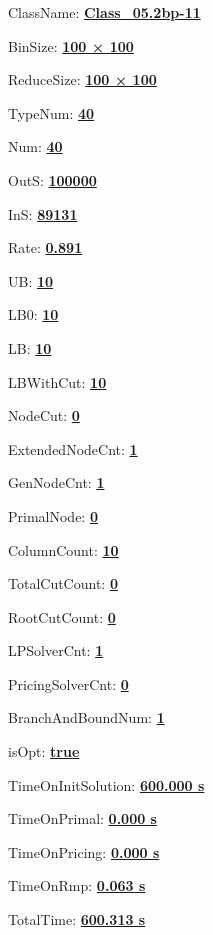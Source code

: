 \documentclass[11pt]{article}
\begin{document}
\pagestyle{empty}


ClassName: \underline{\textbf{Class_05.2bp-11}}
\par
BinSize: \underline{\textbf{100 × 100}}
\par
ReduceSize: \underline{\textbf{100 × 100}}
\par
TypeNum: \underline{\textbf{40}}
\par
Num: \underline{\textbf{40}}
\par
OutS: \underline{\textbf{100000}}
\par
InS: \underline{\textbf{89131}}
\par
Rate: \underline{\textbf{0.891}}
\par
UB: \underline{\textbf{10}}
\par
LB0: \underline{\textbf{10}}
\par
LB: \underline{\textbf{10}}
\par
LBWithCut: \underline{\textbf{10}}
\par
NodeCut: \underline{\textbf{0}}
\par
ExtendedNodeCnt: \underline{\textbf{1}}
\par
GenNodeCnt: \underline{\textbf{1}}
\par
PrimalNode: \underline{\textbf{0}}
\par
ColumnCount: \underline{\textbf{10}}
\par
TotalCutCount: \underline{\textbf{0}}
\par
RootCutCount: \underline{\textbf{0}}
\par
LPSolverCnt: \underline{\textbf{1}}
\par
PricingSolverCnt: \underline{\textbf{0}}
\par
BranchAndBoundNum: \underline{\textbf{1}}
\par
isOpt: \underline{\textbf{true}}
\par
TimeOnInitSolution: \underline{\textbf{600.000 s}}
\par
TimeOnPrimal: \underline{\textbf{0.000 s}}
\par
TimeOnPricing: \underline{\textbf{0.000 s}}
\par
TimeOnRmp: \underline{\textbf{0.063 s}}
\par
TotalTime: \underline{\textbf{600.313 s}}
\par
\newpage


\end{document}

